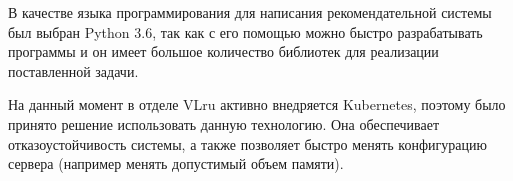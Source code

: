 В качестве языка программирования для написания рекомендательной системы был
выбран Python 3.6, так как с его помощью можно быстро разрабатывать программы и
он имеет большое количество библиотек для реализации поставленной задачи.

На данный момент в отделе VLru активно внедряется Kubernetes, поэтому было принято решение
использовать данную технологию. Она обеспечивает отказоустойчивость системы, а также
позволяет быстро менять конфигурацию сервера (например менять допустимый объем памяти).
